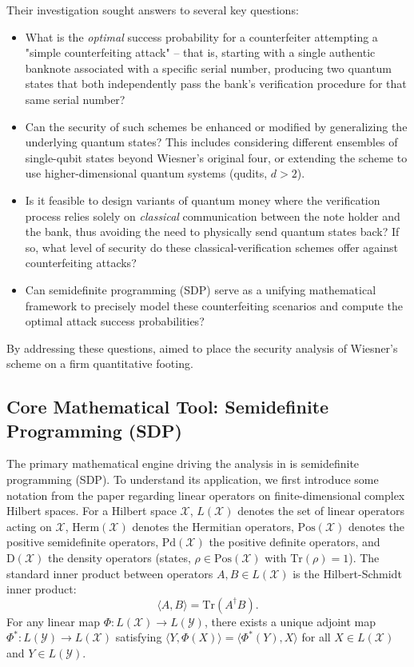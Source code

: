 \documentclass{article} %
\begin{document}
Their investigation sought answers to several key questions:
\begin{itemize}
    \item What is the \textit{optimal} success probability for a counterfeiter attempting a "simple counterfeiting attack" – that is, starting with a single authentic banknote associated with a specific serial number, producing two quantum states that both independently pass the bank's verification procedure for that same serial number?
    \item Can the security of such schemes be enhanced or modified by generalizing the underlying quantum states? This includes considering different ensembles of single-qubit states beyond Wiesner's original four, or extending the scheme to use higher-dimensional quantum systems (qudits, $d>2$).
    \item Is it feasible to design variants of quantum money where the verification process relies solely on \textit{classical} communication between the note holder and the bank, thus avoiding the need to physically send quantum states back? If so, what level of security do these classical-verification schemes offer against counterfeiting attacks?
    \item Can semidefinite programming (SDP) serve as a unifying mathematical framework to precisely model these counterfeiting scenarios and compute the optimal attack success probabilities?
\end{itemize}
By addressing these questions, \citet{Molina2012Optimal} aimed to place the security analysis of Wiesner's scheme on a firm quantitative footing.

\subsection{Core Mathematical Tool: Semidefinite Programming (SDP)}

The primary mathematical engine driving the analysis in \citet{Molina2012Optimal} is semidefinite programming (SDP). To understand its application, we first introduce some notation from the paper regarding linear operators on finite-dimensional complex Hilbert spaces. For a Hilbert space $\mathcal{X}$, $L(\mathcal{X})$ denotes the set of linear operators acting on $\mathcal{X}$, $\mathrm{Herm}(\mathcal{X})$ denotes the Hermitian operators, $\mathrm{Pos}(\mathcal{X})$ denotes the positive semidefinite operators, $\mathrm{Pd}(\mathcal{X})$ the positive definite operators, and $\mathrm{D}(\mathcal{X})$ the density operators (states, $\rho \in \mathrm{Pos}(\mathcal{X})$ with $\mathrm{Tr}(\rho)=1$). The standard inner product between operators $A, B \in L(\mathcal{X})$ is the Hilbert-Schmidt inner product:
\begin{equation}
    \langle A, B \rangle = \mathrm{Tr}(A^\dagger B).
\end{equation}
For any linear map $\Phi: L(\mathcal{X}) \to L(\mathcal{Y})$, there exists a unique adjoint map $\Phi^*: L(\mathcal{Y}) \to L(\mathcal{X})$ satisfying $\langle Y, \Phi(X) \rangle = \langle \Phi^*(Y), X \rangle$ for all $X \in L(\mathcal{X})$ and $Y \in L(\mathcal{Y})$.
\end{document}

